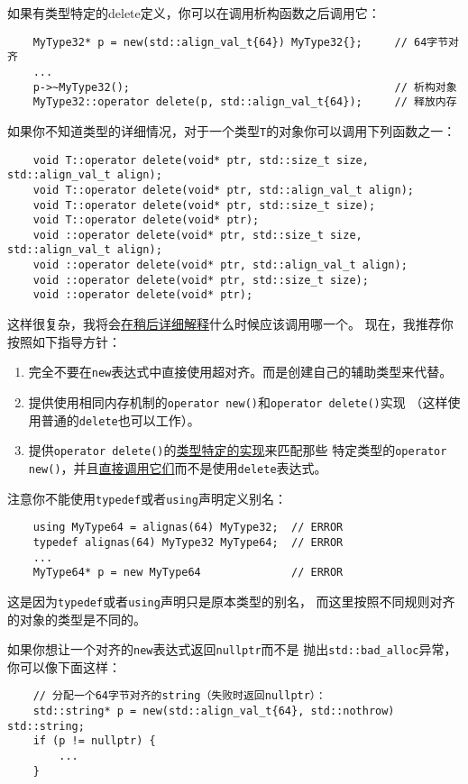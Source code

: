 如果有类型特定的delete定义，你可以在调用析构函数之后调用它：
\begin{lstlisting}
    MyType32* p = new(std::align_val_t{64}) MyType32{};     // 64字节对齐
    ...
    p->~MyType32();                                         // 析构对象
    MyType32::operator delete(p, std::align_val_t{64});     // 释放内存
\end{lstlisting}
如果你不知道类型的详细情况，对于一个类型\texttt{T}的对象你可以调用下列函数之一：
\begin{lstlisting}
    void T::operator delete(void* ptr, std::size_t size, std::align_val_t align);
    void T::operator delete(void* ptr, std::align_val_t align);
    void T::operator delete(void* ptr, std::size_t size);
    void T::operator delete(void* ptr);
    void ::operator delete(void* ptr, std::size_t size, std::align_val_t align);
    void ::operator delete(void* ptr, std::align_val_t align);
    void ::operator delete(void* ptr, std::size_t size);
    void ::operator delete(void* ptr);
\end{lstlisting}
这样很复杂，我将会\hyperref[ch30.2.2.1]{在稍后详细解释}什么时候应该调用哪一个。
现在，我推荐你按照如下指导方针：
\begin{enumerate}
    \item 完全不要在\texttt{new}表达式中直接使用超对齐。而是创建自己的辅助类型来代替。
    \item 提供使用相同内存机制的\texttt{operator new()}和\texttt{operator delete()}实现
    （这样使用普通的\texttt{delete}也可以工作）。
    \item 提供\texttt{operator delete()}的\hyperref[ch30.2.2]{类型特定的实现}来匹配那些
    特定类型的\texttt{operator new()}，并且\hyperref[类型特定delete]{直接调用它们}而不是使用\texttt{delete}表达式。
\end{enumerate}
注意你不能使用\texttt{typedef}或者\texttt{using}声明定义别名：
\begin{lstlisting}
    using MyType64 = alignas(64) MyType32;  // ERROR
    typedef alignas(64) MyType32 MyType64;  // ERROR
    ...
    MyType64* p = new MyType64              // ERROR
\end{lstlisting}
这是因为\texttt{typedef}或者\texttt{using}声明只是原本类型的别名，
而这里按照不同规则对齐的对象的类型是不同的。

如果你想让一个对齐的\texttt{new}表达式返回\texttt{nullptr}而不是
抛出\texttt{std::bad\_alloc}异常，你可以像下面这样：
\begin{lstlisting}
    // 分配一个64字节对齐的string（失败时返回nullptr）：
    std::string* p = new(std::align_val_t{64}, std::nothrow) std::string;
    if (p != nullptr) {
        ...
    }
\end{lstlisting}


